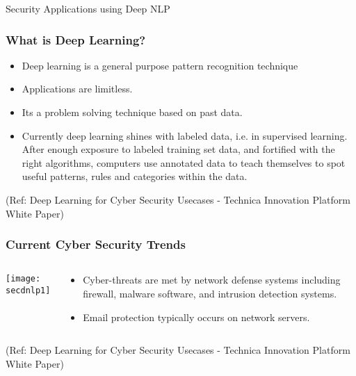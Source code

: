 \begin{frame}
  \begin{center}
    {\Large Security Applications using Deep NLP}
  \end{center}
\end{frame}

\begin{frame}[fragile]\frametitle{What is Deep Learning?}
	\begin{itemize}
	\item  Deep learning is a general purpose pattern recognition technique
	\item Applications are limitless.
	\item Its a problem solving technique based on past data.
	\item Currently deep learning shines with labeled data, i.e. in supervised learning. After
enough exposure to labeled training set data, and fortified with the right
algorithms, computers use annotated data to teach themselves to spot useful
patterns, rules and categories within the data.
	\end{itemize}

\tiny{(Ref: Deep Learning for Cyber Security Usecases -  Technica Innovation
Platform White Paper)}

\end{frame}

\begin{frame}[fragile]\frametitle{Current Cyber Security Trends}

   \begin{columns}[t]
    \begin{column}{0.45\linewidth}
    \begin{center}
     \texttt{[image: secdnlp1]}      
     \end{center}
    \end{column}
    \begin{column}{0.45\linewidth}
		\begin{itemize}
		\item  Cyber-threats are met by network defense systems including firewall, malware
software, and intrusion detection systems. 
\item Email protection typically occurs on network servers.
		\end{itemize}
		

    \end{column}
  \end{columns}

  \tiny{(Ref: Deep Learning for Cyber Security Usecases -  Technica Innovation
Platform White Paper)}
\end{frame}

